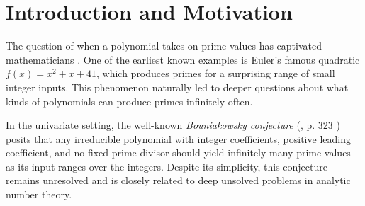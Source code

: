 \documentclass[a4paper,11pt]{article}
\begin{document}

		
	


%
	
	\section{Introduction and Motivation}
	
	The question of when a polynomial takes on prime values has captivated mathematicians \cite{cox,prime1,murty}. One of the earliest known examples is Euler's famous quadratic $f(x) = x^2 + x + 41$, which produces primes for a surprising range of small integer inputs. This phenomenon naturally led to deeper questions about what kinds of polynomials can produce primes infinitely often.
	
	In the univariate setting, the well-known \textit{Bouniakowsky conjecture} (\cite{bouniakowsky}, p. 323 \cite{lang})  posits that any irreducible polynomial with integer coefficients, positive leading coefficient, and no fixed prime divisor should yield infinitely many prime values as its input ranges over the integers. Despite its simplicity, this conjecture remains unresolved and is closely related to deep unsolved problems in analytic number theory.
	
\end{document}
